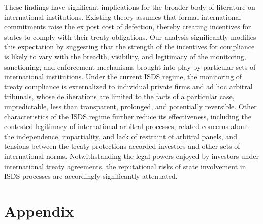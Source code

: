 \documentclass[12pt,onesided]{amsart}
\begin{document}
These findings have significant implications for the broader body of literature on international institutions. Existing theory assumes that formal international commitments raise the ex post cost of defection, thereby creating incentives for states to comply with their treaty obligations. Our analysis significantly modifies this expectation by suggesting that the strength of the incentives for compliance is likely to vary with the breadth, visibility, and legitimacy of the monitoring, sanctioning, and enforcement mechanisms brought into play by particular sets of international institutions. Under the current ISDS regime, the monitoring of treaty compliance is externalized to individual private firms and ad hoc arbitral tribunals, whose deliberations are limited to the facts of a particular case, unpredictable, less than transparent, prolonged, and potentially reversible. Other characteristics of the ISDS regime further reduce its effectiveness, including the contested legitimacy of international arbitral processes,  related concerns about the independence, impartiality, and lack of restraint of arbitral panels, and  tensions between the treaty protections accorded investors and other sets of international norms. Notwithstanding the legal powers enjoyed by investors under international treaty agreements, the reputational risks of state involvement in ISDS processes are accordingly significantly attenuated. 

\newpage





\processdelayedfloats 

\newpage

\section*{Appendix}
\label{appendix}

\appendix
\setcounter{figure}{0} \renewcommand{\thefigure}{A.\arabic{figure}}
\setcounter{table}{0} \renewcommand{\thetable}{A.\arabic{table}}
\end{document}

